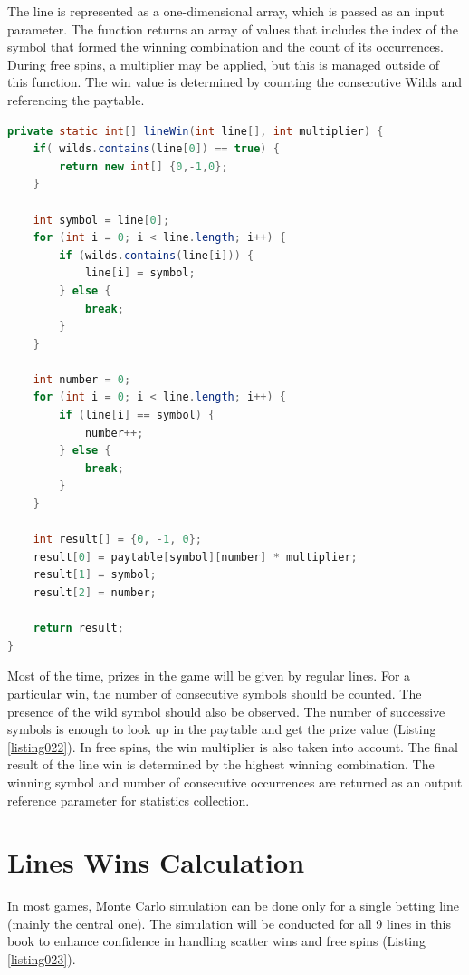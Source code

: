 \documentclass[12pt,twoside,openany]{book}
\begin{document}
The line is represented as a one-dimensional array, which is passed as an input parameter. The function returns an array of values that includes the index of the symbol that formed the winning combination and the count of its occurrences. During free spins, a multiplier may be applied, but this is managed outside of this function. The win value is determined by counting the consecutive Wilds and referencing the paytable.

\begin{lstlisting}[language=Java, caption={Regular line win calculation}, label=listing022]
private static int[] lineWin(int line[], int multiplier) {
	if( wilds.contains(line[0]) == true) {
		return new int[] {0,-1,0};
	}

	int symbol = line[0];
	for (int i = 0; i < line.length; i++) {
		if (wilds.contains(line[i])) {
			line[i] = symbol;
		} else {
			break;
		}
	}

	int number = 0;
	for (int i = 0; i < line.length; i++) {
		if (line[i] == symbol) {
			number++;
		} else {
			break;
		}
	}

	int result[] = {0, -1, 0};
	result[0] = paytable[symbol][number] * multiplier;
	result[1] = symbol;
	result[2] = number;

	return result;
}
\end{lstlisting}

Most of the time, prizes in the game will be given by regular lines. For a particular win, the number of consecutive symbols should be counted. The presence of the wild symbol should also be observed. The number of successive symbols is enough to look up in the paytable and get the prize value (Listing \ref{listing022}). In free spins, the win multiplier is also taken into account. The final result of the line win is determined by the highest winning combination. The winning symbol and number of consecutive occurrences are returned as an output reference parameter for statistics collection.

\section*{Lines Wins Calculation}

In most games, Monte Carlo simulation can be done only for a single betting line (mainly the central one). The simulation will be conducted for all 9 lines in this book to enhance confidence in handling scatter wins and free spins (Listing \ref{listing023}).
\end{document}
